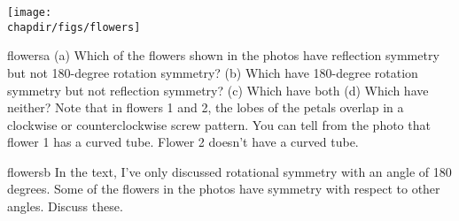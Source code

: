 \vfill\pagebreak[4]
\noindent\texttt{[image: \\chapdir/figs/flowers]}\label{fig:flowers}

\vfill\pagebreak[4]
\begin{hwsection}


\begin{hw}{flowersa}
(a) Which of the flowers shown in the photos have reflection symmetry but not 180-degree
rotation symmetry? \hwendpart
(b) Which have 180-degree rotation symmetry but not reflection symmetry?\hwendpart
(c) Which have both\hwendpart
(d) Which have neither?\hwendpart
Note that in flowers 1 and 2, the lobes of
the petals overlap in a clockwise or counterclockwise screw pattern.
You can tell from the photo that flower 1 has a curved tube. Flower 2 doesn't have a curved tube.
\end{hw}

\begin{hw}{flowersb}
In the text, I've only discussed rotational symmetry with an angle of 180 degrees.
Some of the flowers in the photos have symmetry with respect to other angles. Discuss
these.
\end{hw}


\end{hwsection}

